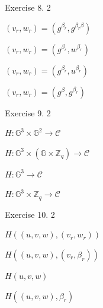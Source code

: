 \documentclass[../lecture-notes-148x210.tex]{subfiles}
\begin{document}
\begin{xexercise}
    {Exercise 8.}
    {}
    {2}
    {
        \item $(v_r,w_r) = (g^{\beta_r},g^{\beta_r\beta})$
        \item $(v_r,w_r) = (g^{\beta_r},w^{\beta_r})$
        \item $(v_r,w_r) = (g^{\beta_r},u^{\beta_r})$
        \item $(v_r,w_r) = (g^{\beta},g^{\beta_r})$
    }
\end{xexercise}

\begin{xexercise}
    {Exercise 9.}
    {}
    {2}
    {
        \item $H: \mathbb{G}^3 \times \mathbb{G}^2 \to \mathcal{C}$
        \item $H: \mathbb{G}^3 \times (\mathbb{G} \times \mathbb{Z}_q) \to \mathcal{C}$
        \item $H: \mathbb{G}^3 \to \mathcal{C}$
        \item $H: \mathbb{G}^3 \times \mathbb{Z}_q \to \mathcal{C}$
    }
\end{xexercise}

\begin{xexercise}
    {Exercise 10.}
    {}
    {2}
    {
        \item $H((u,v,w),(v_r,w_r))$
        \item $H((u,v,w),(v_r,\beta_r))$
        \item $H(u,v,w)$
        \item $H((u,v,w),\beta_r)$
    }
\end{xexercise}
\end{document}
